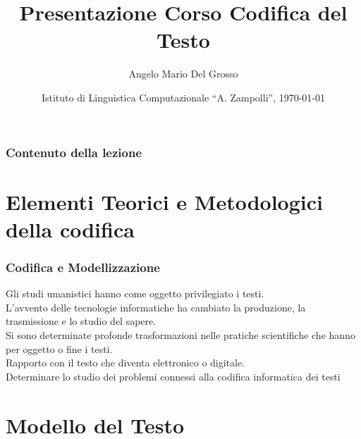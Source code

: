\documentclass{beamer}
\title{Presentazione Corso Codifica del Testo}
\author[A.M. Del Grosso]{Angelo Mario Del Grosso}
\institute{\texttt{angelo.delgrosso@ilc.cnr.it} \\\bigskip\textit{CNR-ILC-LicoLab} \\\bigskip\url{http://licolab.ilc.cnr.it/}}
\date{Istituto di Linguistica Computazionale ``A. Zampolli'', \today}
\begin{document}
\begin{frame}
	\maketitle
\end{frame}

\begin{frame}
	\frametitle{Contenuto della lezione}
	\tableofcontents
\end{frame}

\section{Elementi Teorici e Metodologici della codifica}
\begin{frame}
	\frametitle{Codifica e Modellizzazione}
	\addtocounter{nframe}{1}
    
    \begin{center}
        Gli studi umanistici hanno come oggetto privilegiato i testi.
        \\ L'avvento delle tecnologie informatiche ha cambiato la produzione, la trasmissione e lo studio del sapere.
        \\ Si sono determinate profonde trasformazioni nelle pratiche scientifiche che hanno per oggetto o fine i testi.
        \\ Rapporto con il testo che diventa elettronico o digitale.
        \\ Determinare lo studio dei problemi connessi alla codifica informatica dei testi
	\end{center}

    
\end{frame}

\section{Modello del Testo}

\end{document}
